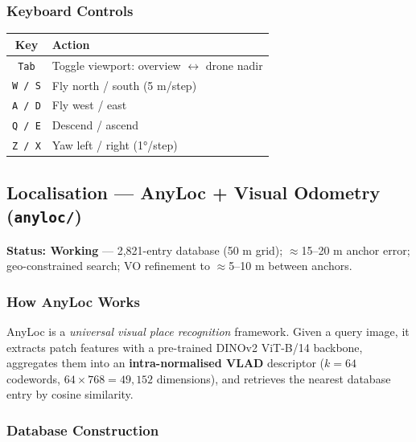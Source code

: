 \documentclass[11pt,a4paper]{article}
\begin{document}
\subsubsection*{Keyboard Controls}

\begin{table}[h]
\centering
\begin{tabular}{@{}cl@{}}
\toprule
\textbf{Key} & \textbf{Action}\\
\midrule
\texttt{Tab} & Toggle viewport: overview $\leftrightarrow$ drone nadir\\
\texttt{W / S} & Fly north / south (5 m/step)\\
\texttt{A / D} & Fly west / east\\
\texttt{Q / E} & Descend / ascend\\
\texttt{Z / X} & Yaw left / right (1°/step)\\
\bottomrule
\end{tabular}
\end{table}

\subsection{Localisation --- AnyLoc + Visual Odometry (\texttt{anyloc/})}
\label{sec:anyloc}

\begin{donebox}
\textbf{Status: Working} --- 2,821-entry database (50 m grid); $\approx$15--20 m anchor error; geo-constrained search; VO refinement to $\approx$5--10 m between anchors.
\end{donebox}

\vspace{6pt}

\subsubsection*{How AnyLoc Works}

AnyLoc is a \textit{universal visual place recognition} framework.
Given a query image, it extracts patch features with a pre-trained DINOv2 ViT-B/14 backbone,
aggregates them into an \textbf{intra-normalised VLAD} descriptor ($k=64$ codewords,
$64 \times 768 = 49{,}152$ dimensions), and retrieves the nearest database entry by cosine similarity.

\subsubsection*{Database Construction}
\end{document}
